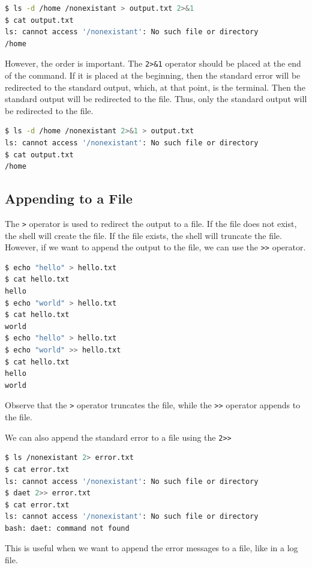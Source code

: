 \begin{lstlisting}[language=bash]
$ ls -d /home /nonexistant > output.txt 2>&1
$ cat output.txt
ls: cannot access '/nonexistant': No such file or directory
/home
\end{lstlisting}

However, the order is important. The \lstinline|2>&1| operator should
be placed at the end of the command. If it is placed at the beginning,
then the standard error will be redirected to the standard output, which,
at that point, is the terminal. Then the standard output will be redirected
to the file. Thus, only the standard output will be redirected to the file.

\begin{lstlisting}[language=bash]
$ ls -d /home /nonexistant 2>&1 > output.txt
ls: cannot access '/nonexistant': No such file or directory
$ cat output.txt
/home
\end{lstlisting}

\subsection{Appending to a File}

The \lstinline|>| operator is used to redirect the output to a file. If the
file does not exist, the shell will create the file. If the file exists,
the shell will truncate the file. However, if we want to append the output
to the file, we can use the \lstinline|>>| operator.

\begin{lstlisting}[language=bash]
$ echo "hello" > hello.txt
$ cat hello.txt
hello
$ echo "world" > hello.txt
$ cat hello.txt
world
$ echo "hello" > hello.txt
$ echo "world" >> hello.txt
$ cat hello.txt
hello
world
\end{lstlisting}

Observe that the \lstinline|>| operator truncates the file, while the
\lstinline|>>| operator appends to the file.

We can also append the standard error to a file using the \lstinline|2>>|

\begin{lstlisting}[language=bash]
$ ls /nonexistant 2> error.txt
$ cat error.txt
ls: cannot access '/nonexistant': No such file or directory
$ daet 2>> error.txt
$ cat error.txt
ls: cannot access '/nonexistant': No such file or directory
bash: daet: command not found
\end{lstlisting}

This is useful when we want to append the error messages to a file,
like in a log file.


